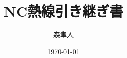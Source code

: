 \documentclass[a4paper,11pt,uplatex]{jsarticle}
\begin{document}
\title{NC熱線引き継ぎ書}
\author{森隼人}
\date{\today}
\maketitle
\end{document}
